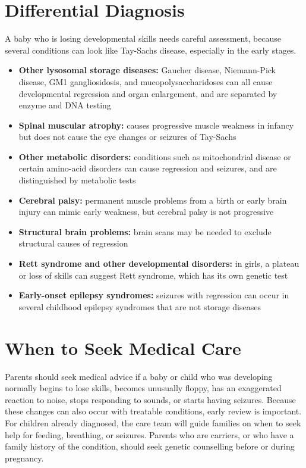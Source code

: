 \section*{Differential Diagnosis}
A baby who is losing developmental skills needs careful assessment, because several conditions can look like Tay-Sachs disease, especially in the early stages.

\begin{itemize}
    \item \textbf{Other lysosomal storage diseases:} Gaucher disease, Niemann-Pick disease, GM1 gangliosidosis, and mucopolysaccharidoses can all cause developmental regression and organ enlargement, and are separated by enzyme and DNA testing
    \item \textbf{Spinal muscular atrophy:} causes progressive muscle weakness in infancy but does not cause the eye changes or seizures of Tay-Sachs
    \item \textbf{Other metabolic disorders:} conditions such as mitochondrial disease or certain amino-acid disorders can cause regression and seizures, and are distinguished by metabolic tests
    \item \textbf{Cerebral palsy:} permanent muscle problems from a birth or early brain injury can mimic early weakness, but cerebral palsy is not progressive
    \item \textbf{Structural brain problems:} brain scans may be needed to exclude structural causes of regression
    \item \textbf{Rett syndrome and other developmental disorders:} in girls, a plateau or loss of skills can suggest Rett syndrome, which has its own genetic test
    \item \textbf{Early-onset epilepsy syndromes:} seizures with regression can occur in several childhood epilepsy syndromes that are not storage diseases
\end{itemize}

\section*{When to Seek Medical Care}
Parents should seek medical advice if a baby or child who was developing normally begins to lose skills, becomes unusually floppy, has an exaggerated reaction to noise, stops responding to sounds, or starts having seizures. Because these changes can also occur with treatable conditions, early review is important. For children already diagnosed, the care team will guide families on when to seek help for feeding, breathing, or seizures. Parents who are carriers, or who have a family history of the condition, should seek genetic counselling before or during pregnancy.

